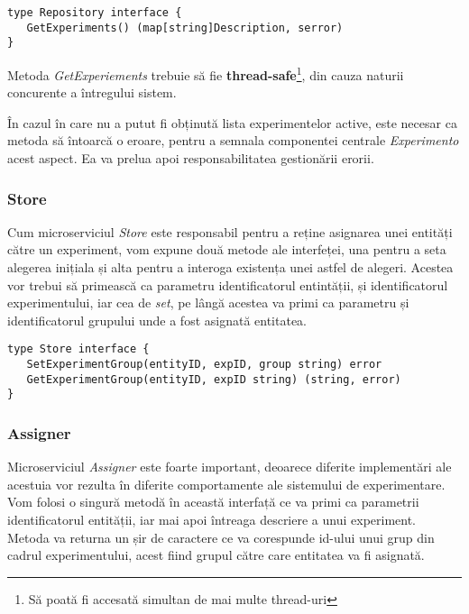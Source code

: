 \begin{center}
	\begin{lstlisting}[language=proto3]
type Repository interface {
   GetExperiments() (map[string]Description, serror)
}
	\end{lstlisting}
\end{center}

\begin{remark}
	Metoda \textit{GetExperiements} trebuie să fie \textbf{thread-safe}\footnote{Să poată fi accesată simultan de mai multe thread-uri}, din cauza naturii concurente a întregului sistem.
\end{remark}

În cazul în care nu a putut fi obținută lista experimentelor active, este necesar ca metoda să întoarcă o eroare, pentru a semnala componentei centrale \textit{Experimento} acest aspect. Ea va prelua apoi responsabilitatea gestionării erorii.

\subsubsection{Store}

Cum microserviciul \textit{Store} este responsabil pentru a reține asignarea unei entități către un experiment, vom expune două metode ale interfeței, una pentru a seta alegerea inițiala și alta pentru a interoga existența unei astfel de alegeri. Acestea vor trebui să primească ca parametru identificatorul entintății, și identificatorul experimentului, iar cea de \textit{set}, pe lângă acestea va primi ca parametru și identificatorul grupului unde a fost asignată entitatea.

\begin{center}
	\begin{lstlisting}[language=proto3]
type Store interface {
   SetExperimentGroup(entityID, expID, group string) error
   GetExperimentGroup(entityID, expID string) (string, error)
}
	\end{lstlisting}
\end{center}

\subsubsection{Assigner}

Microserviciul \textit{Assigner} este foarte important, deoarece diferite implementări ale acestuia vor rezulta în diferite comportamente ale sistemului de experimentare. Vom folosi o singură metodă în această interfață ce va primi ca parametrii identificatorul entității, iar mai apoi întreaga descriere a unui experiment. Metoda va returna un șir de caractere ce va corespunde id-ului unui grup din cadrul experimentului, acest fiind grupul către care entitatea va fi asignată.

